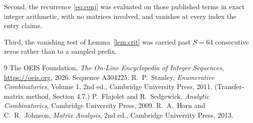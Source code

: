 \documentclass[11pt,a4paper]{article}
\theoremstyle{plain}
\theoremstyle{definition}
\begin{document}
Second, the recurrence \eqref{eq:conj} was evaluated on those published terms in exact
integer arithmetic, with no matrices involved, and vanishes at every index the entry claims.

Third, the vanishing test of Lemma~\ref{lem:crit} was carried past $S=64$ consecutive
zeros rather than to a sampled prefix.

\begin{thebibliography}{9}
 The OEIS Foundation, \emph{The On-Line Encyclopedia of Integer
Sequences}, \url{https://oeis.org}, 2026. Sequence A304225.
 R.~P.~Stanley, \emph{Enumerative Combinatorics}, Volume 1, 2nd ed.,
Cambridge University Press, 2011. (Transfer-matrix method, Section 4.7.)
 P.~Flajolet and R.~Sedgewick, \emph{Analytic Combinatorics}, Cambridge
University Press, 2009.
 R.~A.~Horn and C.~R.~Johnson, \emph{Matrix Analysis}, 2nd ed., Cambridge
University Press, 2013.
\end{thebibliography}
\end{document}
